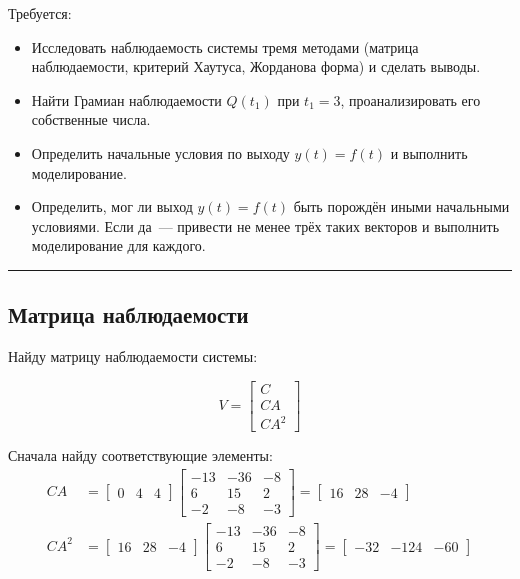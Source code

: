 \documentclass[a4paper,12pt]{article}
\begin{document}
	Требуется:
	
	\begin{itemize}
		\item Исследовать наблюдаемость системы тремя методами (матрица наблюдаемости, критерий Хаутуса, Жорданова форма) и сделать выводы.
		\item Найти Грамиан наблюдаемости $Q(t_1)$ при $t_1 = 3$, проанализировать его собственные числа.
		\item Определить начальные условия по выходу $y(t) = f(t)$ и выполнить моделирование.
		\item Определить, мог ли выход $y(t) = f(t)$ быть порождён иными начальными условиями. Если да~--- привести не менее трёх таких векторов и выполнить моделирование для каждого.
	\end{itemize}
	
	\hrule
	
	\newpage
	\subsection{Матрица наблюдаемости}
	
	Найду матрицу наблюдаемости системы:
	
	\[
	V =
	\begin{bmatrix}
		C \\ CA \\ CA^2
	\end{bmatrix}
	\]
	
	Сначала найду соответствующие элементы:
	\[
	\begin{aligned}
		CA &=
		\begin{bmatrix}
			0 & 4 & 4
		\end{bmatrix}
		\begin{bmatrix}
			-13 & -36 & -8 \\
			6 & 15 & 2 \\
			-2 & -8 & -3
		\end{bmatrix}
		=
		\begin{bmatrix}
			16 & 28 & -4
		\end{bmatrix}
		\\[6pt]
		CA^2 &=
		\begin{bmatrix}
			16 & 28 & -4
		\end{bmatrix}
		\begin{bmatrix}
			-13 & -36 & -8 \\
			6 & 15 & 2 \\
			-2 & -8 & -3
		\end{bmatrix}
		=
		\begin{bmatrix}
			-32 & -124 & -60
		\end{bmatrix}
	\end{aligned}
	\]
	
\end{document}
